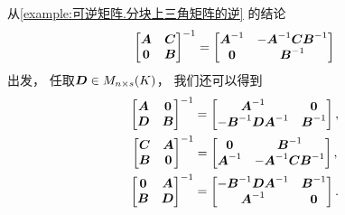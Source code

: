 \begin{remark}
从\cref{example:可逆矩阵.分块上三角矩阵的逆} 的结论\begin{equation*}
	\begin{bmatrix}
		\boldsymbol{A} & \boldsymbol{C} \\
		\boldsymbol0 & \boldsymbol{B}
	\end{bmatrix}^{-1}
	= \begin{bmatrix}
		\boldsymbol{A}^{-1} & -\boldsymbol{A}^{-1} \boldsymbol{C} \boldsymbol{B}^{-1} \\
		\boldsymbol0 & \boldsymbol{B}^{-1}
	\end{bmatrix}
\end{equation*}出发，
任取\(\boldsymbol{D} \in M_{n \times s}(K)\)，
我们还可以得到\begin{gather*}
	\begin{bmatrix}
		\boldsymbol{A} & \boldsymbol0 \\
		\boldsymbol{D} & \boldsymbol{B}
	\end{bmatrix}^{-1}
	= \begin{bmatrix}
		\boldsymbol{A}^{-1} & \boldsymbol0 \\
		-\boldsymbol{B}^{-1} \boldsymbol{D} \boldsymbol{A}^{-1} & \boldsymbol{B}^{-1}
	\end{bmatrix}, \\
	\begin{bmatrix}
		\boldsymbol{C} & \boldsymbol{A} \\
		\boldsymbol{B} & \boldsymbol0
	\end{bmatrix}^{-1}
	= \begin{bmatrix}
		\boldsymbol0 & \boldsymbol{B}^{-1} \\
		\boldsymbol{A}^{-1} & -\boldsymbol{A}^{-1}\boldsymbol{C}\boldsymbol{B}^{-1}
	\end{bmatrix}, \\
	\begin{bmatrix}
		\boldsymbol0 & \boldsymbol{A} \\
		\boldsymbol{B} & \boldsymbol{D}
	\end{bmatrix}^{-1}
	= \begin{bmatrix}
		-\boldsymbol{B}^{-1}\boldsymbol{D}\boldsymbol{A}^{-1} & \boldsymbol{B}^{-1} \\
		\boldsymbol{A}^{-1} & \boldsymbol0
	\end{bmatrix}.
\end{gather*}


\end{remark}
